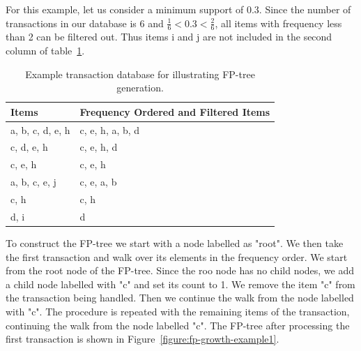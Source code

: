 For this example, let us consider a minimum support of 0.3. Since the number of transactions in our database is 6 and $ \frac{1}{6} < 0.3 < \frac{2}{6} $, all items with frequency less than 2 can be filtered out. Thus items i and j are not included in the second column of table~\ref{table:fp-growth-example1}. 

\begin{table}[!htbp]
\begin{center}
    \begin{tabular}{ | l | l | }
    \hline
	\textbf{Items} & \textbf{Frequency Ordered and Filtered Items} \\ \hline
    a, b, c, d, e, h & c, e, h, a, b, d \\ \hline 
    c, d, e, h & c, e, h, d \\ \hline 
    c, e, h & c, e, h \\ \hline 
    a, b, c, e, j & c, e, a, b \\ \hline 
    c, h & c, h \\ \hline
    d, i & d \\ \hline
    \end{tabular}
    \caption{Example transaction database for illustrating FP-tree generation.}
    \label{table:fp-growth-example1}
\end{center}
\end{table} 

To construct the FP-tree we start with a node labelled as "root". We then take the first transaction and walk over its elements in the frequency order. We start from the root node of the FP-tree. Since the roo node has no child nodes, we add a child node labelled with "c" and set its count to 1. We remove the item "c" from the transaction being handled. Then we continue the walk from the node labelled with "c". The procedure is repeated with the remaining items of the transaction, continuing the walk from the node labelled "c". The FP-tree after processing the first transaction is shown in Figure~\ref{figure:fp-growth-example1}.

